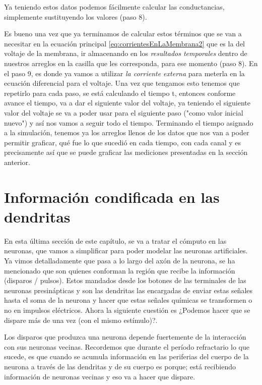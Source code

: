 Ya teniendo estos datos podemos fácilmente calcular las conductancias, simplemente sustituyendo los valores (paso 8).

Es bueno una vez que ya terminamos de calcular estos términos que se van a necesitar en la ecuación principal  \ref{eq:corrientesEnLaMembrana2} que es la del voltaje de la membrana,  ir almacenando en los \emph{resultados temporales} dentro de nuestros arreglos en la casilla que les corresponda, para ese momento (paso 8). En el paso 9, es donde ya vamos a utilizar \emph{la corriente externa} para meterla en la ecuación diferencial para el voltaje. Una vez que tengamos esto tenemos que repetirlo para cada paso, se está calculando el tiempo t,  entonces conforme avance el tiempo, va a dar el siguiente valor del voltaje, ya teniendo el siguiente valor del voltaje se va a poder usar para el siguiente paso ("como valor inicial nuevo") y así nos vamos a seguir todo el tiempo. 
Terminando el tiempo asignado a la simulación, tenemos ya los arreglos llenos de los datos que nos van a poder permitir graficar, qué fue lo que sucedió en cada tiempo, con cada canal y es precisamente  así que se puede graficar las mediciones presentadas en la sección anterior.


\section{Información condificada en las dendritas}

En esta última sección de este capítulo, se va a tratar el cómputo en las neuronas, que vamos a simplificar para poder modelar las neuronas artificiales. Ya vimos detalladamente que pasa a lo largo del axón de la neurona, se ha mencionado que son quienes conforman la región que recibe la información (disparos / pulsos). Estos mandados desde los botones de las terminales de las neuronas presinápticas y son las dendritas las encargadas de enviar estas señales hasta el soma de la neurona y hacer que estas señales químicas se transformen o no en impulsos eléctricos. Ahora la siguiente cuestión es ¿Podemos hacer que se dispare más de una vez (con el mismo estímulo)?.

Los disparos que produzca una neurona depende fuertemente de la interacción con sus neuronas vecinas. Recordemos que durante el período refractario lo que sucede, es que cuando se acumula información en las periferias del cuerpo de la neurona a través de las dendritas y de su cuerpo es porque; está recibiendo información de neuronas vecinas y eso va a hacer que dispare.

